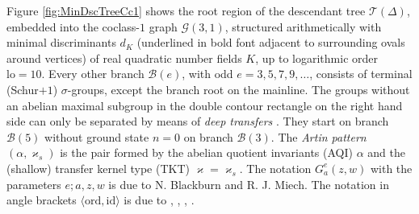\documentclass{amsart}
\theoremstyle{definition}
\theoremstyle{remark}
\begin{document}
\noindent
Figure
\ref{fig:MinDscTreeCc1}
shows the root region of the descendant tree
\(\mathcal{T}(\Delta)\),
embedded into the
coclass-\(1\) graph \(\mathcal{G}(3,1)\),
structured arithmetically with
minimal discriminants \(d_K\)
(underlined in bold font adjacent to surrounding ovals around vertices)
of real quadratic number fields \(K\),
up to logarithmic order \(\mathrm{lo}=10\).
Every other branch \(\mathcal{B}(e)\), with odd \(e=3,5,7,9,\ldots\),
consists of terminal (Schur\(+1\)) \(\sigma\)-groups,
except the branch root on the mainline.
The groups without an abelian maximal subgroup
in the double contour rectangle on the right hand side
can only be separated by means of \textit{deep transfers}
\cite{Ma2018}.
They start on branch \(\mathcal{B}(5)\)
without ground state \(n=0\) on branch \(\mathcal{B}(3)\).
The \textit{Artin pattern} \((\alpha,\varkappa_s)\) is the pair formed by 
the abelian quotient invariants (AQI) \(\alpha\)
and the (shallow) transfer kernel type (TKT) \(\varkappa=\varkappa_s\).
The notation \(G_a^e(z,w)\) with the parameters \(e;a,z,w\) is due to N. Blackburn and R. J. Miech.
The notation in angle brackets \(\langle\mathrm{ord},\mathrm{id}\rangle\) is due to
\cite{BEO2005},
\cite{GNO2006},
\cite{MAGMA2026},
\cite{MAGMA6561}.
\end{document}
